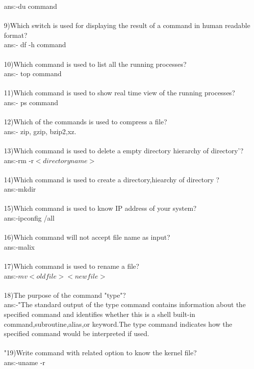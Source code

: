 \documentclass{article}
\begin{document}
{ans:-du command\\
\\9)Which switch is used for displaying the result of a command in human readable format?\\
ans:- df -h command\\
\\
10)Which command is used to list all the running processes?\\
ans:- top command\\
\\
11)Which command is used to show real time view of the running processes?\\
ans:- ps command\\
\\
12)Which of the commands is used to compress a file?\\
ans:- zip, gzip, bzip2,xz.\\
\\
13)Which command is used to delete a empty directory hierarchy of directory'?\\
ans:-rm -r$<directory name>$\\
\\
14)Which command is used to create a directory,hiearchy of directory ?\\
ans:-mkdir\\
\\
15)Which command is used to know IP address of your system?\\
ans:-ipconfig /all\\
\\
16)Which command will not accept file name as input?\\
ans:-malix\\
\\
17)Which command is used to rename a file?\\
ans:-$mv<oldfile><newfile>$\\
\\
18)The purpose of the command "type"?\\
ans:-"The standard output of the type command contains information about the specified command
and identifies whether this is a shell built-in command,subroutine,alias,or keyword.The type
command indicates how the specified command would be interpreted if used.\\
\\"19)Write command with related option to know the kernel file?\\
ans:-uname -r\\
\\
}
\end{document}
